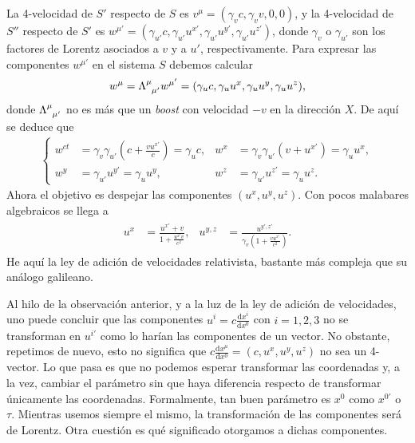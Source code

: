 La 4-velocidad de \(S'\) respecto de \(S\) es \(v^\mu = (\gamma_v c, \gamma_v v, 0, 0)\), y la 4-velocidad de \(S''\) respecto de \(S'\) es \(w^{\mu'} = (\gamma_{u'} c, \gamma_{u'} u^{x'}, \gamma_{u'} u^{y'}, \gamma_{u'} u^{z'})\), donde \(\gamma_v\) o \(\gamma_{u'}\) son los factores de Lorentz asociados a \(v\) y a \(u'\), respectivamente. Para expresar las componentes \(w^{\mu'}\) en el sistema \(S\) debemos calcular
\begin{equation}
    w^{\mu} = \tensor{\Lambda}{^{\mu}_{\mu'}} w^{\mu'} = (\gamma_u c, \gamma_u u^{x}, \gamma_u u^{y}, \gamma_u u^{z}),
\end{equation}
donde \(\tensor{\Lambda}{^\mu_{\mu'}}\) no es más que un \textit{boost} con velocidad \(-v\) en la dirección \(X\). De aquí se deduce que 
\begin{align}
    \left\{
    \begin{aligned}
        w^{ct} &= \gamma_v\gamma_{u'}\left(c + \frac{v u^{x'}}{c}\right)=\gamma_{u} c, & w^{x} &= \gamma_v \gamma_{u'}(v + u^{x'}) = \gamma_u u^x, \\
        w^{y} &= \gamma_{u'} u^{y'}=\gamma_{u} u^{y}, & w^{z} &= \gamma_{u'} u^{z'}=\gamma_{u} u^{z}.
    \end{aligned}
    \right.
\end{align}
Ahora el objetivo es despejar las componentes \((u^{x}, u^{y}, u^{z})\). Con pocos malabares algebraicos se llega a 
\begin{align}
    \begin{aligned}
        u^{x} &= \frac{u^{x'} + v}{1 + \frac{u^{x'} v}{c^2}}, & u^{y,z} &= \frac{u^{y',z'}}{\gamma_v \left(1 + \frac{v u^{x'}}{c^2}\right)}.
    \end{aligned}
\end{align}
He aquí la ley de adición de velocidades relativista, bastante más compleja que su análogo galileano.

Al hilo de la observación anterior, y a la luz de la ley de adición de velocidades, uno puede concluir que las componentes \(u^{i} = c\frac{\mathrm{d}x^i}{\mathrm{d}x^0}\) con \(i = 1, 2, 3\) no se transforman en \(u^{i'}\) como lo harían las componentes de un vector. No obstante, repetimos de nuevo, esto no significa que \(c\frac{\mathrm{d}x^\mu}{\mathrm{d}x^0} = (c, u^x, u^y, u^z)\) no sea un 4-vector. Lo que pasa es que no podemos esperar transformar las coordenadas y, a la vez, cambiar el parámetro sin que haya diferencia respecto de transformar únicamente las coordenadas. Formalmente, tan buen parámetro es \(x^0\) como \(x^{0'}\) o \(\tau\). Mientras usemos siempre el mismo, la transformación de las componentes será de Lorentz. Otra cuestión es qué significado otorgamos a dichas componentes. 

